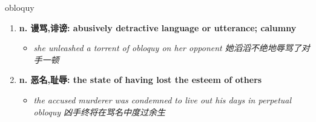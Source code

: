 
\begin{frame}
{\huge obloquy}
\begin{center}
\begin{enumerate}\Large
  \item \textbf{n. 谩骂,诽谤: abusively detractive language or utterance; calumny}
  \begin{itemize}
    \item \em{\Large{she unleashed a torrent of obloquy on her opponent 她滔滔不绝地辱骂了对手一顿}}
  \end{itemize}
  \item \textbf{n. 恶名,耻辱: the state of having lost the esteem of others}
  \begin{itemize}
    \item \em{\Large{the accused murderer was condemned to live out his days in perpetual obloquy 凶手终将在骂名中度过余生}}
  \end{itemize}
\end{enumerate}
\end{center}
\end{frame}
